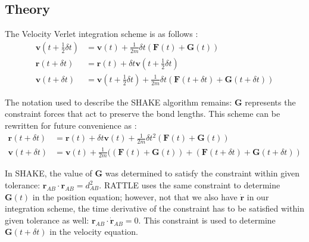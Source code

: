 \subsection{Theory}
\label{sec:rattle-theory}
\par The Velocity Verlet integration scheme is as follows \cite{allen}:
\begin{equation}
\label{eq:velocity-verlet}
\begin{aligned}
	\mathbf{v}(t + \frac{1}{2}\delta t) &= \mathbf{v}(t) + \frac{1}{2 m} \delta t (\mathbf{F}(t) + \mathbf{G}(t))	\\
	\mathbf{r}(t + \delta t) &= \mathbf{r}(t) + \delta t \mathbf{v}(t + \frac{1}{2}\delta t) 			\\
	\mathbf{v}(t + \delta t) &= \mathbf{v}(t + \frac{1}{2}\delta t) + \frac{1}{2 m} \delta t (\mathbf{F}(t + \delta t) + \mathbf{G}(t + \delta t))
\end{aligned}
\end{equation}
\par The notation used to describe the SHAKE algorithm remains: $\mathbf{G}$ represents the constraint forces that act to preserve the bond lengths. This scheme can be rewritten for future convenience as \cite{Rattle}:
\begin{equation}
\label{eq:rattle-velocity-verlet}
\begin{aligned}
	\mathbf{r}(t + \delta t) &= \mathbf{r}(t) + \delta t \mathbf{v}(t) + \frac{1}{2m} \delta t^2 (\mathbf{F}(t) + \mathbf{G}(t)) \\
	\mathbf{v}(t + \delta t) &= \mathbf{v}(t) + \frac{1}{2m} ((\mathbf{F}(t) + \mathbf{G}(t)) + (\mathbf{F}(t + \delta t) + \mathbf{G}(t + \delta t))
\end{aligned}
\end{equation}
\par In SHAKE, the value of $\mathbf{G}$ was determined to satisfy the constraint within given tolerance: $\mathbf{r}_{AB} \cdot \mathbf{r}_{AB} = d_{AB}^2$. RATTLE uses the same constraint to determine $\mathbf{G}(t)$ in the position equation; however, not that we also have $\dot{\mathbf{r}}$ in our integration scheme, the time derivative of the constraint has to be satisfied within given tolerance as well: $\mathbf{r}_{AB} \cdot \dot{\mathbf{r}}_{AB} = 0$. This constraint is used to determine $\mathbf{G}(t + \delta t)$ in the velocity equation. 
